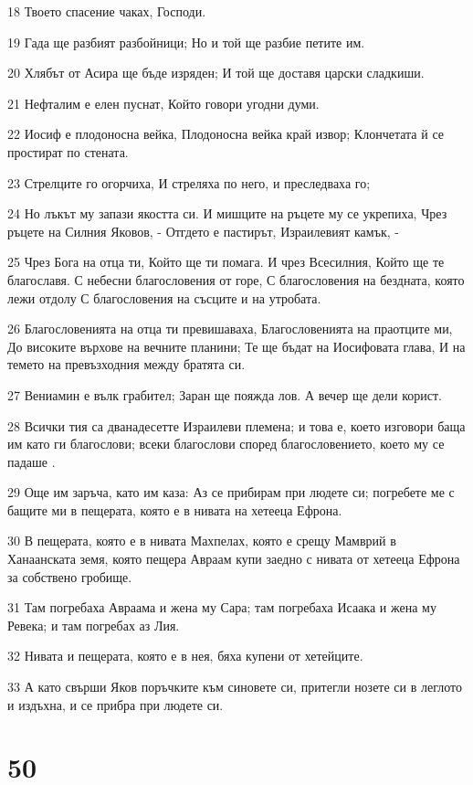 \par 18 Твоето спасение чаках, Господи.
\par 19 Гада ще разбият разбойници; Но и той ще разбие петите им.
\par 20 Хлябът от Асира ще бъде изряден; И той ще доставя царски сладкиши.
\par 21 Нефталим е елен пуснат, Който говори угодни думи.
\par 22 Иосиф е плодоносна вейка, Плодоносна вейка край извор; Клончетата й се простират по стената.
\par 23 Стрелците го огорчиха, И стреляха по него, и преследваха го;
\par 24 Но лъкът му запази якостта си. И мишците на ръцете му се укрепиха, Чрез ръцете на Силния Яковов, - Отгдето е пастирът, Израилевият камък, -
\par 25 Чрез Бога на отца ти, Който ще ти помага. И чрез Всесилния, Който ще те благославя. С небесни благословения от горе, С благословения на бездната, която лежи отдолу С благословения на съсците и на утробата.
\par 26 Благословенията на отца ти превишаваха, Благословенията на праотците ми, До високите върхове на вечните планини; Те ще бъдат на Иосифовата глава, И на темето на превъзходния между братята си.
\par 27 Вениамин е вълк грабител; Заран ще пояжда лов. А вечер ще дели корист.
\par 28 Всички тия са дванадесетте Израилеви племена; и това е, което изговори баща им като ги благослови; всеки благослови според благословението, което му се падаше .
\par 29 Още им заръча, като им каза: Аз се прибирам при людете си; погребете ме с бащите ми в пещерата, която е в нивата на хетееца Ефрона.
\par 30 В пещерата, която е в нивата Махпелах, която е срещу Мамврий в Ханаанската земя, която пещера Авраам купи заедно с нивата от хетееца Ефрона за собствено гробище.
\par 31 Там погребаха Авраама и жена му Сара; там погребаха Исаака и жена му Ревека; и там погребах аз Лия.
\par 32 Нивата и пещерата, която е в нея, бяха купени от хетейците.
\par 33 А като свърши Яков поръчките към синовете си, притегли нозете си в леглото и издъхна, и се прибра при людете си.

\chapter{50}

